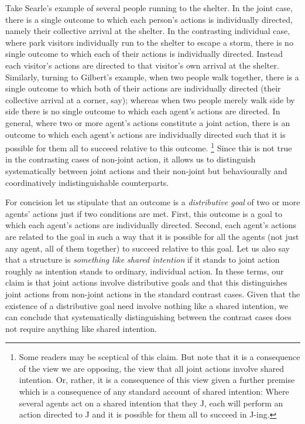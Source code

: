 \documentclass[12pt,\papersize]{extarticle}
\begin{document}
Take Searle's example of several people running to the shelter.  
In the joint case, there is a single outcome to which each person's actions is individually directed, namely their collective arrival at the shelter.  
In the contrasting individual case, where park visitors individually run to the shelter to escape a storm, there is no single outcome to which each of their actions is individually directed.  
Instead each visitor's actions are directed to that visitor's own arrival at the shelter.  
Similarly, turning to Gilbert's example, when two people walk together, there is a single outcome to which both of their actions are individually directed (their collective arrival at a corner, say); whereas when two people merely walk side by side there is no single outcome to which each agent's actions are directed.  
In general, where two or more agent's actions constitute a joint action, there is an outcome to which each agent's actions are individually directed such that it is possible for them all to succeed relative to this outcome.%
\footnote{
Some readers may be sceptical of this claim.
But note that it is a consequence of the view we are opposing, the view that all joint actions involve shared intention.
Or, rather, it is a consequence of this view given a further premise which is a consequence of any standard account of shared intention: Where several agents act on a shared intention that they J, 
each will perform an action directed to J and it is possible for them all to succeed in J-ing.
} 
Since this is not true in the contrasting cases of non-joint action, it allows us to distinguish systematically between joint actions and their non-joint but behaviourally and coordinatively indistinguishable counterparts.  

For concision let us stipulate that an outcome is a \emph{distributive goal} of two or more agents' actions just if two conditions are met.
First, this outcome is a goal to which each agent's actions are individually directed.
Second, each agent's actions are related to the goal in such a way that it is possible for all the agents (not just any agent, all of them together) to succeed relative to this goal.
Let us also say that a structure is \emph{something like shared intention} if it stands to joint action roughly as intention stands to ordinary, individual action.  
In these terms, our claim is that joint actions involve distributive goals and that this distinguishes joint actions from non-joint actions in the standard contrast cases.  
Given that the existence of a distributive goal need involve nothing like a shared intention, we can conclude that systematically distinguishing between the contrast cases does not require anything like shared intention.
 
\end{document}
